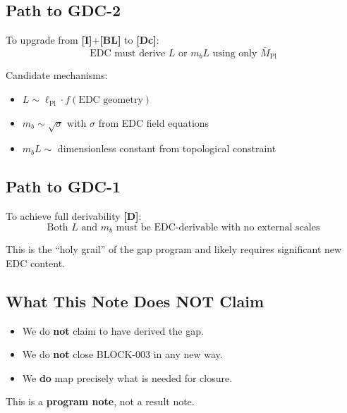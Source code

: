\documentclass[11pt,a4paper]{article}
\newcommand{\Mpl}{\bar{M}_{\mathrm{Pl}}}
\newcommand{\mb}{m_b}
\newcommand{\tagD}{\textbf{[D]}}
\newcommand{\tagDc}{\textbf{[Dc]}}
\newcommand{\tagI}{\textbf{[I]}}
\newcommand{\tagBL}{\textbf{[BL]}}
\theoremstyle{definition}
\theoremstyle{plain}
\theoremstyle{remark}
\begin{document}
\subsection{Path to GDC-2}

To upgrade from \tagI{}+\tagBL{} to \tagDc{}:
\begin{equation}
\boxed{\text{EDC must derive } L \text{ or } \mb L \text{ using only } \Mpl}
\label{eq:path-to-gdc2}
\end{equation}

Candidate mechanisms:
\begin{itemize}
\item $L \sim \ell_{\mathrm{Pl}} \cdot f(\text{EDC geometry})$
\item $\mb \sim \sqrt{\sigma}$ with $\sigma$ from EDC field equations
\item $\mb L \sim $ dimensionless constant from topological constraint
\end{itemize}

\subsection{Path to GDC-1}

To achieve full derivability \tagD{}:
\begin{equation}
\boxed{\text{Both } L \text{ and } \mb \text{ must be EDC-derivable with no external scales}}
\label{eq:path-to-gdc1}
\end{equation}

This is the ``holy grail'' of the gap program and likely requires significant
new EDC content.

\subsection{What This Note Does NOT Claim}

\begin{itemize}
\item We do \textbf{not} claim to have derived the gap.
\item We do \textbf{not} close BLOCK-003 in any new way.
\item We \textbf{do} map precisely what is needed for closure.
\end{itemize}

This is a \textbf{program note}, not a result note.

\appendix
\end{document}
